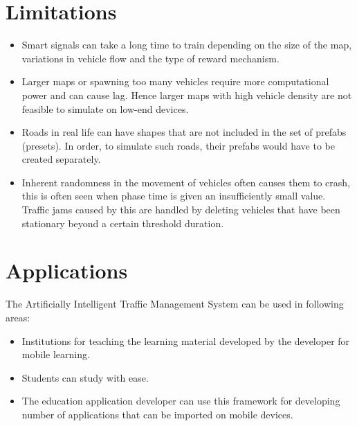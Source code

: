 \documentclass[openany,12pt]{report}
\begin{document}
		\section{Limitations}
		\begin{itemize}
			\item{Smart signals can take a long time to train depending on the size of the map, variations in vehicle flow and the type of reward mechanism.}
			\item{Larger maps or spawning too many vehicles require more computational power and can cause lag. Hence larger maps with high vehicle density are not feasible to simulate on low-end devices.}
			\item{Roads in real life can have shapes that are not included in the set of prefabs (presets). In order, to simulate such roads, their prefabs would have to be created separately.}
			\item{Inherent randomness in the movement of vehicles often causes them to crash, this is often seen when phase time is given an insufficiently small value. Traffic jams caused by this are handled by deleting vehicles that have been stationary beyond a certain threshold duration.}
		\end{itemize}				
		
		
		\section{Applications}
		\hspace*{0.5in}The Artificially Intelligent Traffic Management System can be used in following areas:
		\begin{itemize}
			\item{Institutions for teaching the learning material developed by the developer for mobile learning.}
			\item{Students can study with ease.}
			\item{The education application developer can use this framework for developing number of applications that can be imported on mobile devices.}
		\end{itemize}
		
\end{document}
